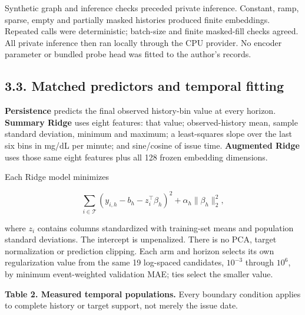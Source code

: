\documentclass[11pt,letterpaper]{article}
\begin{document}
Synthetic graph and inference checks preceded private inference.
Constant, ramp, sparse, empty and partially masked histories produced
finite embeddings. Repeated calls were deterministic; batch-size and
finite masked-fill checks agreed. All private inference then ran locally
through the CPU provider. No encoder parameter or bundled probe head was
fitted to the author's records.

\subsection{3.3. Matched predictors and temporal
fitting}\label{matched-predictors-and-temporal-fitting}

\textbf{Persistence} predicts the final observed history-bin value at
every horizon. \textbf{Summary Ridge} uses eight features: that value;
observed-history mean, sample standard deviation, minimum and maximum; a
least-squares slope over the last six bins in mg/dL per minute; and
sine/cosine of issue time. \textbf{Augmented Ridge} uses those same
eight features plus all 128 frozen embedding dimensions.

Each Ridge model minimizes

\[
\sum_{i\in\mathcal{T}}(y_{i,h}-b_h-z_i^\top\beta_h)^2
+\alpha_h\lVert\beta_h\rVert_2^2,
\]

where \(z_i\) contains columns standardized with training-set means and
population standard deviations. The intercept is unpenalized. There is
no PCA, target normalization or prediction clipping. Each arm and
horizon selects its own regularization value from the same 19 log-spaced
candidates, \(10^{-3}\) through \(10^6\), by minimum event-weighted
validation MAE; ties select the smaller value.

\textbf{Table 2. Measured temporal populations.} Every boundary
condition applies to complete history or target support, not merely the
issue date.
\end{document}
